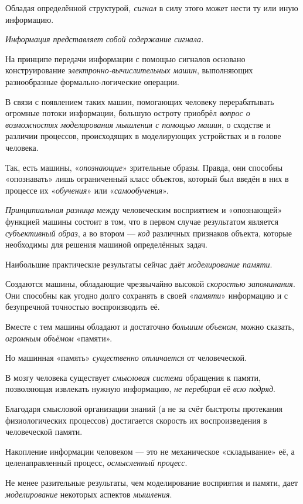 \documentclass[a4paper,14pt,russian]{extreport}
\begin{document}
Обладая определённой структурой\emph{, сигнал} в силу этого может нести ту или иную информацию.

\emph{Информация представляет собой содержание сигнала.}

На принципе передачи информации с помощью сигналов основано конструирование \emph{электронно-вычислительных машин}, выполняющих разнообразные формально-логические операции.

В связи с появлением таких машин, помогающих человеку перерабатывать огромные потоки информации, большую остроту приобрёл \emph{вопрос о возможностях моделирования мышления с помощью машин}, о сходстве и различии процессов, происходящих в моделирующих устройствах и в голове человека.

Так, есть машины, «\emph{опознающие}» зрительные образы. Правда, они способны «опознавать» лишь ограниченный класс объектов, который был введён в них в процессе их «\emph{обучения}» или «\emph{самообучения}».

\emph{Принципиальная разница} между человеческим восприятием и «опознающей» функцией машины состоит в том, что в первом случае результатом является \emph{субъективный образ}, а во втором --- \emph{код} различных признаков объекта, которые необходимы для решения машиной определённых задач.

Наибольшие практические результаты сейчас даёт \emph{моделирование памяти}.

Создаются машины, обладающие чрезвычайно высокой \emph{скоростью запоминания}. Они способны как угодно долго сохранять в своей «\emph{памяти}» информацию и с безупречной точностью воспроизводить её.

Вместе с тем машины обладают и достаточно \emph{большим объемом}, можно сказать, \emph{огромным объёмом} «памяти».

Но машинная «память» \emph{существенно отличается} от человеческой.

В мозгу человека существует \emph{смысловая система} обращения к памяти, позволяющая извлекать нужную информацию, \emph{не перебирая} её \emph{всю подряд}.

Благодаря смысловой организации знаний (а не за счёт быстроты протекания физиологических процессов) достигается скорость их воспроизведения в человеческой памяти.

Накопление информации человеком --- это не механическое «складывание» её, а целенаправленный процесс, \emph{осмысленный процесс}.

Не менее разительные результаты, чем моделирование восприятия и памяти, дает \emph{моделирование} некоторых аспектов \emph{мышления}.
\end{document}

